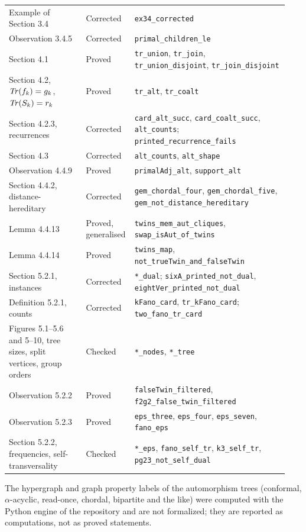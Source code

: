 {\begin{longtable}{@{}>{\raggedright\arraybackslash}p{0.27\linewidth}>{\raggedright\arraybackslash}p{0.13\linewidth}>{\raggedright\arraybackslash}p{0.54\linewidth}@{}}
Example of Section 3.4 & Corrected & \texttt{ex34\_corrected}\\
Observation 3.4.5 & Corrected & \texttt{primal\_children\_le}\\
Section 4.1 & Proved & \texttt{tr\_union}, \texttt{tr\_join}, \texttt{tr\_union\_disjoint}, \texttt{tr\_join\_disjoint}\\
Section 4.2, $\mathit{Tr}(f_k)=g_k$, $\mathit{Tr}(S_k)=r_k$ & Proved & \texttt{tr\_alt}, \texttt{tr\_coalt}\\
Section 4.2.3, recurrences & Corrected & \texttt{card\_alt\_succ}, \texttt{card\_coalt\_succ}, \texttt{alt\_counts}; \texttt{printed\_recurrence\_fails}\\
Section 4.3 & Corrected & \texttt{alt\_counts}, \texttt{alt\_shape}\\
Observation 4.4.9 & Proved & \texttt{primalAdj\_alt}, \texttt{support\_alt}\\
Section 4.4.2, distance-hereditary & Corrected & \texttt{gem\_chordal\_four}, \texttt{gem\_chordal\_five}, \texttt{gem\_not\_distance\_hereditary}\\
Lemma 4.4.13 & Proved, generalised & \texttt{twins\_mem\_aut\_cliques}, \texttt{swap\_isAut\_of\_twins}\\
Lemma 4.4.14 & Proved & \texttt{twins\_map}, \texttt{not\_trueTwin\_and\_falseTwin}\\
Section 5.2.1, instances & Corrected & \texttt{*\_dual}; \texttt{sixA\_printed\_not\_dual}, \texttt{eightVer\_printed\_not\_dual}\\
Definition 5.2.1, counts & Corrected & \texttt{kFano\_card}, \texttt{tr\_kFano\_card}; \texttt{two\_fano\_tr\_card}\\
Figures 5.1--5.6 and 5--10, tree sizes, split vertices, group orders & Checked & \texttt{*\_nodes}, \texttt{*\_tree}\\
Observation 5.2.2 & Proved & \texttt{falseTwin\_filtered}, \texttt{f2g2\_false\_twin\_filtered}\\
Observation 5.2.3 & Proved & \texttt{eps\_three}, \texttt{eps\_four}, \texttt{eps\_seven}, \texttt{fano\_eps}\\
Section 5.2.2, frequencies, self-transversality & Checked & \texttt{*\_eps}, \texttt{fano\_self\_tr}, \texttt{k3\_self\_tr}, \texttt{pg23\_not\_self\_dual}\\
\end{longtable}}

The hypergraph and graph property labels of the automorphism trees (conformal, $\alpha$-acyclic, read-once, chordal, bipartite and the like) were computed with the Python engine of the repository and are not formalized; they are reported as computations, not as proved statements.
